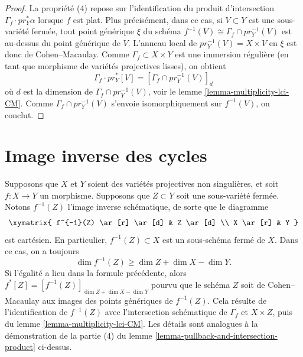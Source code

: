 \begin{proof}
\medskip\noindent
La propriété (4) repose sur l'identification du produit d'intersection
$\Gamma_f \cdot pr_Y^*\alpha$ lorsque $f$ est plat. Plus précisément, dans ce
cas, si $V \subset Y$ est une sous-variété fermée, tout point générique
$\xi$ du schéma $f^{-1}(V) \cong \Gamma_f \cap pr_Y^{-1}(V)$
est au-dessus du point générique de $V$. L'anneau local de
$pr_Y^{-1}(V) = X \times V$ en $\xi$ est donc de Cohen--Macaulay. Comme
$\Gamma_f \subset X \times Y$ est une immersion régulière (en tant que morphisme de
variétés projectives lisses), on obtient
$$
\Gamma_f \cdot pr_Y^*[V] = [\Gamma_f \cap pr_Y^{-1}(V)]_d
$$
où $d$ est la dimension de $\Gamma_f \cap pr_Y^{-1}(V)$, voir le
lemme \ref{lemma-multiplicity-lci-CM}. Comme $\Gamma_f \cap pr_Y^{-1}(V)$
s'envoie isomorphiquement sur $f^{-1}(V)$, on conclut.
\end{proof}


\section{Image inverse des cycles}
\label{section-pullback-cycles}

\noindent
Supposons que $X$ et $Y$ soient des variétés
projectives non singulières, et soit $f : X \to Y$ un morphisme.
Supposons que $Z \subset Y$ soit une sous-variété fermée. Notons $f^{-1}(Z)$
l'image inverse schématique, de sorte que le diagramme
$$
\xymatrix{
f^{-1}(Z) \ar[r] \ar[d] & Z \ar[d] \\
X \ar[r] & Y
}
$$
est cartésien. En particulier, $f^{-1}(Z) \subset X$
est un sous-schéma fermé de $X$. Dans ce cas, on a toujours
$$
\dim f^{-1}(Z) \geq \dim Z + \dim X - \dim Y.
$$
Si l'égalité a lieu dans la formule précédente, alors
$f^*[Z] = [f^{-1}(Z)]_{\dim Z + \dim X - \dim Y}$
pourvu que le schéma $Z$ soit de Cohen--Macaulay aux images
des points génériques de $f^{-1}(Z)$. Cela résulte de l'identification de
$f^{-1}(Z)$ avec l'intersection schématique de $\Gamma_f$
et $X \times Z$, puis du lemme \ref{lemma-multiplicity-lci-CM}.
Les détails sont analogues à la démonstration de la partie (4) du
lemme \ref{lemma-pullback-and-intersection-product} ci-dessus.











